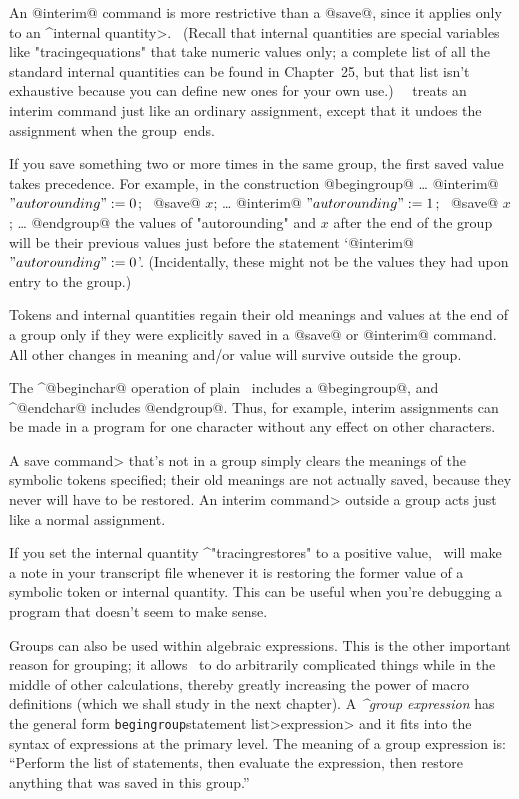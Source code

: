 {{{{\danger An @interim@ command is more restrictive than a @save@, since it
applies only to an ^\<internal quantity>. \ (Recall that internal
quantities are special variables like "tracingequations" that take numeric
values only; a complete list of all the standard internal quantities can
be found in Chapter~25, but that list isn't exhaustive because you can
define new ones for your own use.) \ \MF\ treats an interim command just
like an ordinary assignment, except that it undoes the assignment when the
group~ends.

\danger If you save something two or more times in the same group,
the first saved value takes precedence. For example, in the construction
\begindisplay
@begingroup@\cr
\noalign{\vskip-3pt}\dots\cr
@interim@ $"autorounding":=0$; \ @save@ $x$;\cr
\noalign{\vskip-3pt}\dots\cr
@interim@ $"autorounding":=1$; \ @save@ $x$;\cr
\noalign{\vskip-3pt}\dots\cr
@endgroup@\cr
\enddisplay
the values of "autorounding" and $x$ after the end of the group will be
their previous values just before the statement `@interim@ $"autorounding":=0$'.
(Incidentally, these might not be the values they had upon entry to the group.)

\danger Tokens and internal quantities regain their old meanings and
values at the end of a group only if they were explicitly saved in a
@save@ or @interim@ command. All other changes in meaning and/or value
will survive outside the group.

\danger The ^@beginchar@ operation of plain \MF\ includes a @begingroup@,
and ^@endchar@ includes @endgroup@. Thus, for example, interim assignments
can be made in a program for one character without any effect on other
characters.

\danger A \<save command> that's not in a group simply clears the meanings
of the symbolic tokens specified; their old meanings are not actually saved,
because they never will have to be restored. An \<interim command>
outside a group acts just like a normal assignment.

\danger If you set the internal quantity ^"tracingrestores" to a positive
value, \MF\ will make a note in your transcript file whenever it is
restoring the former value of a symbolic token or internal quantity.
This can be useful when you're debugging a program that doesn't seem
to make sense.

Groups can also be used within algebraic expressions. This is
the other important reason for grouping; it allows \MF\ to do arbitrarily
complicated things while in the middle of other calculations, thereby
greatly increasing the power of macro definitions (which we shall study
in the next chapter). A {\sl^{group expression}\/} has the general form
\begindisplay
{\tt begingroup}\thinspace\<statement list>\thinspace\<expression>
\enddisplay
and it fits into the syntax of expressions at the primary level. The
meaning of a group expression is: ``Perform the list of statements,
then evaluate the expression, then restore anything that was saved
in this group.''

}}}}
